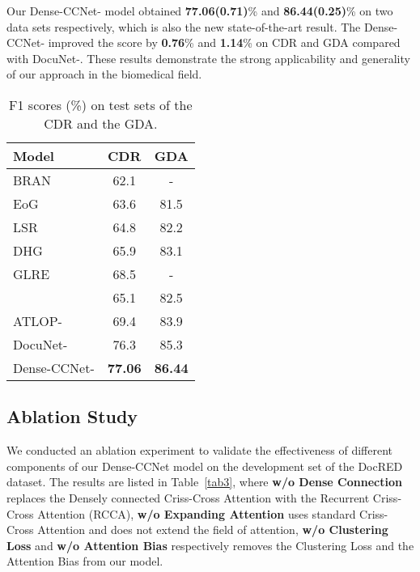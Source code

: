 \documentclass[11pt]{article}
\begin{document}
Our Dense-CCNet- model obtained \textbf{77.06(0.71)}\%  and \textbf{86.44(0.25)}\%  on two data sets respectively, which is also the new state-of-the-art result.
The Dense-CCNet-  improved the  score by \textbf{0.76}\% and \textbf{1.14}\% on CDR and GDA compared with DocuNet-. 
These results demonstrate the strong applicability and generality of our approach in the biomedical field.

 







\begin{table}[]
\centering
\begin{tabular}{p{4.7cm}cc} 
\toprule
Model               & CDR          & GDA         \\ [2pt] \toprule
BRAN \cite{c:137}                & 62.1         & -           \\
EoG \cite{c:107}                & 63.6         & 81.5        \\
LSR \cite{c:106}                & 64.8         & 82.2        \\
DHG \cite{c:139}                & 65.9         & 83.1        \\
GLRE \cite{c:108}                & 68.5         & -           \\
 \cite{c:127}        & 65.1         & 82.5        \\
ATLOP-\cite{c:112}   & 69.4         & 83.9        \\
DocuNet-\cite{c:113} & 76.3         & 85.3        \\  [2pt] \toprule
Dense-CCNet-         & \textbf{77.06} & \textbf{86.44}    \\
\bottomrule
\end{tabular}
\caption{\label{tab2} F1 scores (\%) on test sets of the CDR and the GDA.}
\end{table}



\subsection{Ablation Study}
We conducted an ablation experiment to validate the effectiveness of different components of our Dense-CCNet model on the development set of the DocRED dataset.
The results are listed in Table~\ref{tab3}, where 
\textbf{w/o Dense Connection} replaces the Densely connected Criss-Cross Attention with the Recurrent Criss-Cross Attention (RCCA),
\textbf{w/o Expanding Attention} uses standard Criss-Cross Attention and does not extend the field of attention, 
\textbf{w/o Clustering Loss} and \textbf{w/o Attention Bias} respectively removes the Clustering Loss and the Attention Bias from our model.
\end{document}
